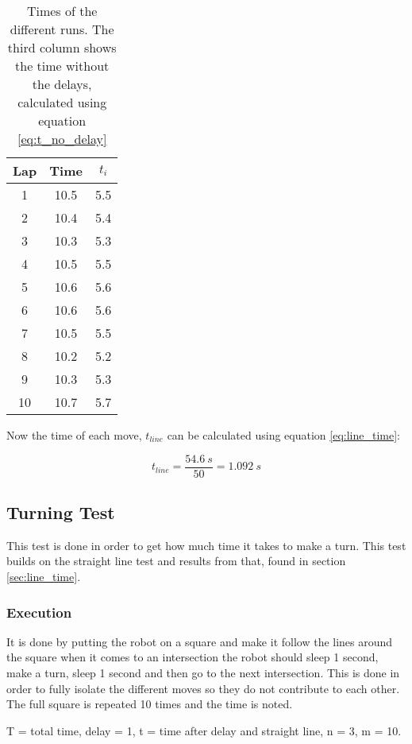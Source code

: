 \begin{table} [H]
\centering
 \begin{tabular}{|c|c|c|}
  \hline Lap & Time  & $t_i$ \\ \hline
  1 & 10.5  & 5.5 \\  \hline
  2 & 10.4  & 5.4 \\  \hline
  3 & 10.3  & 5.3 \\  \hline
  4 & 10.5  & 5.5 \\  \hline
  5 & 10.6  & 5.6 \\  \hline
  6 & 10.6  & 5.6 \\  \hline
  7 & 10.5  & 5.5 \\  \hline
  8 & 10.2  & 5.2 \\  \hline
  9 & 10.3  & 5.3 \\  \hline
  10 & 10.7 &  5.7 \\ \hline
 \end{tabular}
 \caption{Times of the different runs. The third column shows the time without the delays, calculated using equation \ref{eq:t_no_delay}}
 \label{tab:time_straight}
\end{table}

Now the time of each move, $t_{line}$ can be calculated using equation \ref{eq:line_time}:

$$
t_{line} = \frac{54.6\ s}{50} = 1.092\ s
$$

\subsection{Turning Test} \label{sec:turn_time}

This test is done in order to get how much time it takes to make a turn. This test builds on the straight line test and results from that, found in section \ref{sec:line_time}.

\subsubsection{Execution}
It is done by putting the robot on a square and make it follow the lines around the square when it comes to an intersection the robot should sleep 1 second, make a turn, sleep 1 second and then go to the next intersection. This is done in order to fully isolate the different moves so they do not contribute to each other. The full square is repeated 10 times and the time is noted. 

T = total time, delay = 1, t = time after delay and straight line, n = 3, m = 10.

